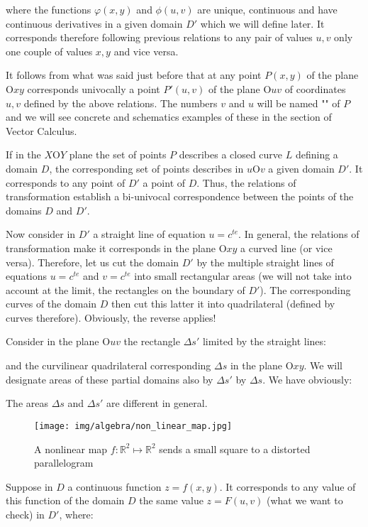 	where the functions $\varphi (x,y)$ and $\phi(u,v)$ are unique, continuous and have continuous derivatives in a given domain $D'$ which we will define later. It corresponds therefore following previous relations to any pair of values $u, v$ only one couple of values $x, y$ and vice versa.
	
	It follows from what was said just before that at any point $P(x,y)$ of the plane $\text{O}xy$  corresponds univocally a point $P '(u, v)$ of the plane $\text{O}uv$ of coordinates $u, v$ defined by the above relations. The numbers $v$ and $u$ will be named "\label{curvilinear coordinates}" of $P$ and we will see concrete and schematics examples of these in the section of Vector Calculus.
	
	If in the $X\text{O}Y$ plane the set of points $P$ describes a closed curve $L$ defining a domain $D$, the corresponding set of points describes in $u\text{O}v$ a given domain $D'$. It corresponds to any point of $D'$ a point of $D$. Thus, the relations of transformation establish a bi-univocal correspondence between the points of the domains $D$ and $D'$.
	
	Now consider in $D'$ a straight line of equation $u=c^{te}$. In general, the relations of transformation make it corresponds in the plane $\text{O}xy$ a curved line (or vice versa). Therefore, let us cut the domain $D'$ by the multiple straight lines of equations $u=c^{te}$ and $v=c^{te}$ into small rectangular areas (we will not take into account at the limit, the rectangles on the boundary of $D'$). The corresponding curves of the domain $D$ then cut this latter it into quadrilateral (defined by curves therefore). Obviously, the reverse applies!
	
	Consider in the plane $\text{O}uv$ the rectangle $\Delta s'$ limited by the straight lines:
	
	and the curvilinear quadrilateral corresponding $\Delta s$ in the plane $\text{O}xy$. We will designate areas of these partial domains also  by $\Delta s'$ by $\Delta s$. We have obviously:
	
	The areas $\Delta s$ and $\Delta s'$ are different in general.
	 \begin{figure}[H]
		\centering
		\texttt{[image: img/algebra/non\_linear\_map.jpg]}
		\caption{A nonlinear map $f : \mathbb{R}^2\mapsto \mathbb{R}^2$ sends a small square to a distorted parallelogram}
	\end{figure}
	Suppose in $D$ a continuous function $z=f(x,y)$. It corresponds to any value of this function of the domain $D$ the same value $z=F(u,v)$ (what we want to check) in $D'$, where:
	
